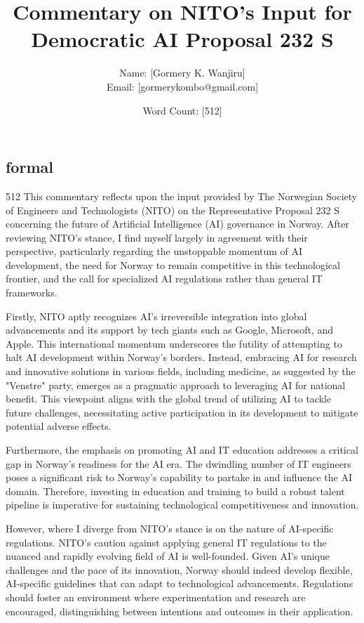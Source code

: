 \documentclass[12pt]{article}
\title{Commentary on NITO's Input for Democratic AI Proposal 232 S}
\author{Name: [Gormery K. Wanjiru] \\ Email: [gormerykombo@gmail.com]}
\date{Word Count: [512]}
\begin{document}
\maketitle

\subsection{formal}512
This commentary reflects upon the input provided by The Norwegian Society of Engineers and Technologists (NITO) on the Representative Proposal 232 S concerning the future of Artificial Intelligence (AI) governance in Norway. After reviewing NITO's stance, I find myself largely in agreement with their perspective, particularly regarding the unstoppable momentum of AI development, the need for Norway to remain competitive in this technological frontier, and the call for specialized AI regulations rather than general IT frameworks.

Firstly, NITO aptly recognizes AI's irreversible integration into global advancements and its support by tech giants such as Google, Microsoft, and Apple. This international momentum underscores the futility of attempting to halt AI development within Norway's borders. Instead, embracing AI for research and innovative solutions in various fields, including medicine, as suggested by the "Venstre" party, emerges as a pragmatic approach to leveraging AI for national benefit. This viewpoint aligns with the global trend of utilizing AI to tackle future challenges, necessitating active participation in its development to mitigate potential adverse effects.

Furthermore, the emphasis on promoting AI and IT education addresses a critical gap in Norway's readiness for the AI era. The dwindling number of IT engineers poses a significant risk to Norway's capability to partake in and influence the AI domain. Therefore, investing in education and training to build a robust talent pipeline is imperative for sustaining technological competitiveness and innovation.

However, where I diverge from NITO's stance is on the nature of AI-specific regulations. NITO's caution against applying general IT regulations to the nuanced and rapidly evolving field of AI is well-founded. Given AI's unique challenges and the pace of its innovation, Norway should indeed develop flexible, AI-specific guidelines that can adapt to technological advancements. Regulations should foster an environment where experimentation and research are encouraged, distinguishing between intentions and outcomes in their application.
\end{document}
